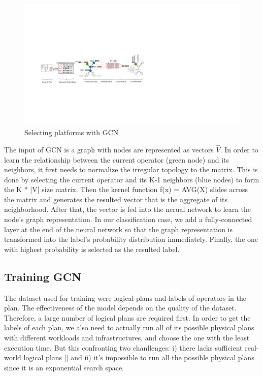 \begin{figure}
  \centering
  \includegraphics[width=\linewidth]{figures/GCN-new.pdf}
  \caption{Selecting platforms with GCN}
  \label{fig:gcn}
\end{figure}

The input of GCN is a graph with nodes are represented as vectors $\hat{V}$. 
In order to learn the relationship between the current operator (green node) and its neighbors, it first needs to normalize the irregular topology to the matrix. 
This is done by selecting the current operator and its K-1 neighbors (blue nodes) to form the K * |V| size matrix. 
Then the kernel function f(x) = AVG(X) slides across the matrix and generates the resulted vector that is the aggregate of its neighborhood. 
After that, the vector is fed into the nerual network to learn the node's graph representation. 
In our classification case, we add a fully-connected layer at the end of the neural network so that the graph representation is transformed into the label's probability distribution immediately. 
Finally, the one with highest probability is selected as the resulted label.


\subsection{Training GCN}
The dataset used for training were logical plans and labels of operators in the plan. 
The effectiveness of the model depends on the quality of the dataset. 
Therefore, a large number of logical plans are required first. 
In order to get the labels of each plan, we also need to actually run all of its possible physical plans with different workloads and infrastructures, and choose the one with the least execution time. 
But this confronting two chanllenges: 
i) there lacks sufficient real-world logical plans [] and 
ii) it's impossible to run all the possible physical plans since it is an exponential search space. 

